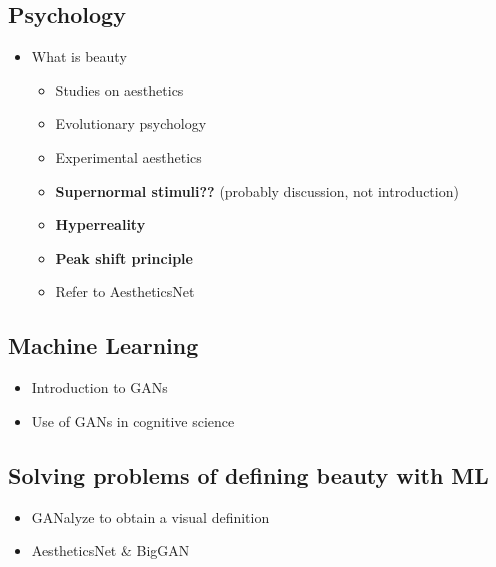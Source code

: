 \documentclass[../main.tex]{subfiles}
\begin{document}
	\subsection{Psychology}
		\begin{itemize}
			\item What is beauty
			\begin{itemize}
				\item Studies on aesthetics
				\item Evolutionary psychology
				\item Experimental aesthetics
				\item \textbf{Supernormal stimuli??} (probably discussion, not introduction)
				\item \textbf{Hyperreality}
				\item \textbf{Peak shift principle}
				\item Refer to AestheticsNet
			\end{itemize}
		\end{itemize}
	
	\subsection{Machine Learning}
		\begin{itemize}
			\item Introduction to GANs
			\item Use of GANs in cognitive science
		\end{itemize}

	\subsection{Solving problems of defining beauty with ML}
		\begin{itemize}
			\item GANalyze to obtain a visual definition
			\item AestheticsNet \& BigGAN
		\end{itemize}
\end{document}
